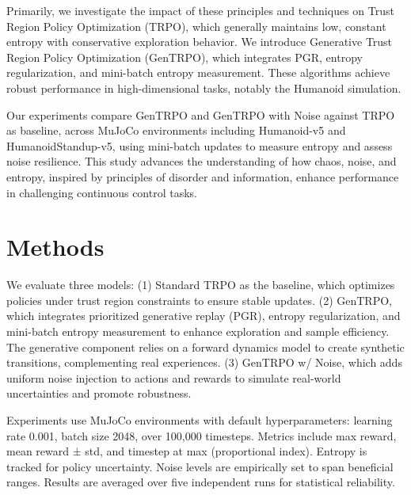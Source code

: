 \documentclass{svproc}
\begin{document}
Primarily, we investigate the impact of these principles and techniques on Trust Region Policy Optimization (TRPO), which generally maintains low, constant entropy with conservative exploration behavior. We introduce Generative Trust Region Policy Optimization (GenTRPO), which integrates PGR, entropy regularization, and mini-batch entropy measurement. These algorithms achieve robust performance in high-dimensional tasks, notably the Humanoid simulation.

Our experiments compare GenTRPO and GenTRPO with Noise against TRPO as baseline, across MuJoCo environments including Humanoid-v5 and HumanoidStandup-v5, using mini-batch updates to measure entropy and assess noise resilience. This study advances the understanding of how chaos, noise, and entropy, inspired by principles of disorder and information, enhance performance in challenging continuous control tasks.

\section{Methods}
We evaluate three models: (1) Standard TRPO as the baseline, which optimizes policies under trust region constraints to ensure stable updates. (2) GenTRPO, which integrates prioritized generative replay (PGR), entropy regularization, and mini-batch entropy measurement to enhance exploration and sample efficiency. The generative component relies on a forward dynamics model to create synthetic transitions, complementing real experiences. (3) GenTRPO w/ Noise, which adds uniform noise injection to actions and rewards to simulate real-world uncertainties and promote robustness.

Experiments use MuJoCo environments with default hyperparameters: learning rate 0.001, batch size 2048, over 100,000 timesteps. Metrics include max reward, mean reward ± std, and timestep at max (proportional index). Entropy is tracked for policy uncertainty. Noise levels are empirically set to span beneficial ranges. Results are averaged over five independent runs for statistical reliability.
\end{document}
